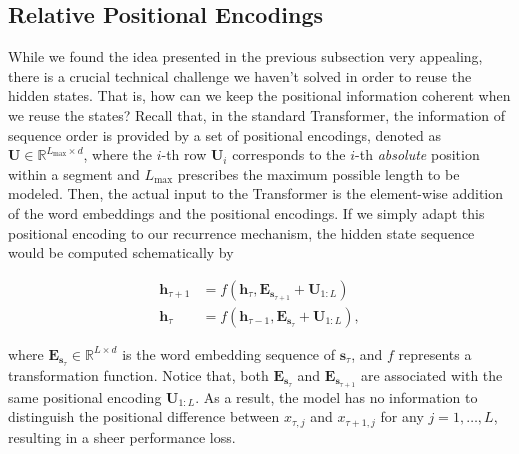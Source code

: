 \documentclass[11pt,a4paper]{article}
\def\rvh{{\mathbf{h}}}
\def\rvs{{\mathbf{s}}}
\def\rmE{{\mathbf{E}}}
\def\rmU{{\mathbf{U}}}
\newcommand{\R}{\mathbb{R}}
\begin{document}
\subsection{Relative Positional Encodings}
\label{sec:rel-pos-embed}
While we found the idea presented in the previous subsection very appealing, there is a crucial technical challenge we haven't solved in order to reuse the hidden states.
That is, how can we keep the positional information coherent when we reuse the states?
Recall that, in the standard Transformer, the information of sequence order is provided by a set of positional encodings, denoted as $\rmU \in \R^{L_\text{max} \times d}$, where the $i$-th row $\rmU_i$ corresponds to the $i$-th \textit{absolute} position within a segment and $L_\text{max}$ prescribes the maximum possible length to be modeled.
Then, the actual input to the Transformer is the element-wise addition of the word embeddings and the positional encodings.
If we simply adapt this positional encoding to our recurrence mechanism, the hidden state sequence would be computed schematically by
\par\nobreak
\vspace{-0.5em}
\small
\begin{align*}
	\rvh_{\tau+1} &= f(\rvh_{\tau}, \rmE_{\rvs_{\tau+1}} + \rmU_{1:L}) \\
	\rvh_{\tau} &= f(\rvh_{\tau-1}, \rmE_{\rvs_{\tau}} + \rmU_{1:L}),
\end{align*}
\normalsize
\vspace{-1.5em}


\noindent where $\rmE_{\rvs_{\tau}} \in \R^{L \times d}$ is the word embedding sequence of $\rvs_{\tau}$, and $f$ represents a transformation function.
Notice that, both $\rmE_{\rvs_{\tau}}$ and $\rmE_{\rvs_{\tau+1}}$ are associated with the same positional encoding $\rmU_{1:L}$.
As a result, the model has no information to distinguish the positional difference between $x_{\tau,j}$ and $x_{\tau+1,j}$ for any $j = 1, \dots, L$, resulting in a sheer performance loss.
\end{document}
